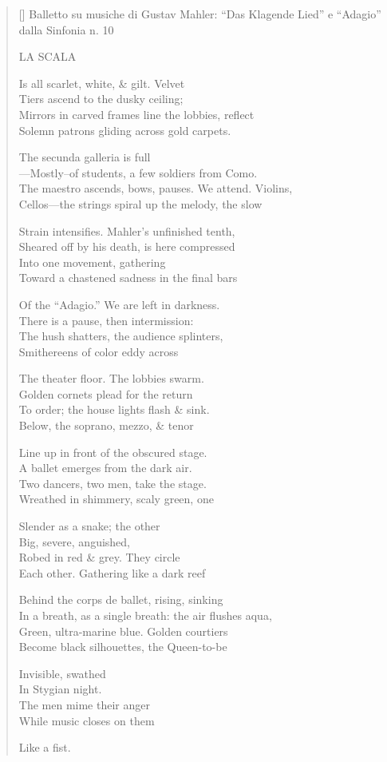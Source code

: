 \label{ch:milano_la_scala}
\settowidth{\versewidth}{Balletto su musiche di Gustav Mahler: “Das Klagende Lied” e “Adagio” dalla Sinfonia n. 10   }
\begin{verse}[\versewidth]
Balletto su musiche di Gustav Mahler: ``Das Klagende Lied'' e ``Adagio'' dalla Sinfonia n. 10   

LA SCALA

Is all scarlet, white, \& gilt. Velvet\\
Tiers ascend to the dusky ceiling;\\
Mirrors in carved frames line the lobbies, reflect\\
Solemn patrons gliding across gold carpets.

The secunda galleria is full\\
---Mostly--of students, a few soldiers from Como.\\
The maestro ascends, bows, pauses. We attend.  Violins,\\
Cellos---the strings spiral up the melody, the slow

Strain intensifies.  Mahler's unfinished tenth,\\
Sheared off by his death, is here compressed\\
Into one movement, gathering\\
Toward a chastened sadness in the final bars

Of the ``Adagio.''    We are left in darkness.\\
There is a pause, then intermission:\\
The hush shatters, the audience splinters,\\
Smithereens of color eddy across

The theater floor.  The lobbies swarm.\\
Golden cornets plead for the return\\
To order; the house lights flash \& sink.\\
Below, the soprano, mezzo, \& tenor

Line up in front of the obscured stage.\\
A ballet emerges from the dark air.\\
Two dancers, two men, take the stage.\\
Wreathed in shimmery, scaly green, one

Slender as a snake; the other\\
Big, severe, anguished,\\
Robed in red \& grey.   They circle\\
Each other.  Gathering like a dark reef

Behind the corps de ballet, rising, sinking\\
In a breath, as a single breath: the air flushes aqua,\\
Green, ultra-marine blue. Golden courtiers\\
Become black silhouettes, the Queen-to-be

Invisible, swathed\\
In Stygian night.\\
The men mime their anger\\
While music closes on them

Like a fist.
\end{verse}
